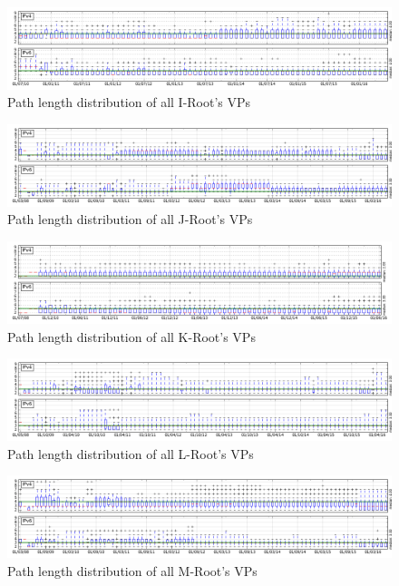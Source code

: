 \begin{appendices}
		\begin{figure}[!htb]
			\centering
			\includegraphics[width=6.0in]{img/path_avg_all_i.png}
			\caption{Path length distribution of all I-Root's VPs}
			\label{fig:path-avg-all-i}
		\end{figure}
		
		\begin{figure}[!htb]
			\centering
			\includegraphics[width=6.0in]{img/path_avg_all_j.png}
			\caption{Path length distribution of all J-Root's VPs}
			\label{fig:path-avg-all-j}
		\end{figure}
		\begin{figure}[!htb]
			\centering
			\includegraphics[width=6.0in]{img/path_avg_all_k.png}
			\caption{Path length distribution of all K-Root's VPs}
			\label{fig:path-avg-all-k}
		\end{figure}
		\begin{figure}[!htb]
			\centering
			\includegraphics[width=6.0in]{img/path_avg_all_l.png}
			\caption{Path length distribution of all L-Root's VPs}
			\label{fig:path-avg-all-l}
		\end{figure}
		\begin{figure}[htbp]
			\centering
			\includegraphics[width=6.0in]{img/path_avg_all_m.png}
			\caption{Path length distribution of all M-Root's VPs}
			\label{fig:path-avg-all-m}
		\end{figure}


\end{appendices}
